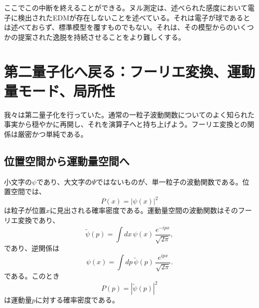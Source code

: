 \begin{classroomqa}
\end{classroomqa}

\begin{classroomqa}
\end{classroomqa}

ここでこの中断を終えることができる。ヌル測定は、述べられた感度において電子に検出されたEDMが存在しないことを述べている。それは電子が球であるとは述べておらず、標準模型を覆すものでもない。それは、その模型からのいくつかの提案された逸脱を持続させることをより難しくする。

\section{第二量子化へ戻る：フーリエ変換、運動量モード、局所性}

我々は第二量子化を行っていた。通常の一粒子波動関数についてのよく知られた事実から穏やかに再開し、それを演算子へと持ち上げよう。フーリエ変換との関係は厳密かつ単純である。

\subsection{位置空間から運動量空間へ}

小文字の\(\psi\)であり、大文字の\(\Psi\)ではないものが、単一粒子の波動関数である。位置空間では、
\begin{equation}
P(x)=|\psi(x)|^2
\end{equation}
は粒子が位置\(x\)に見出される確率密度である。運動量空間の波動関数はそのフーリエ変換であり、
\begin{equation}
\tilde{\psi}(p)=\int dx\,\psi(x)\,\frac{e^{-ipx}}{\sqrt{2\pi}},
\end{equation}
であり、逆関係は
\begin{equation}
\psi(x)=\int dp\,\tilde{\psi}(p)\,\frac{e^{ipx}}{\sqrt{2\pi}}.
\end{equation}
である。このとき
\begin{equation}
P(p)=|\tilde{\psi}(p)|^2
\end{equation}
は運動量\(p\)に対する確率密度である。

